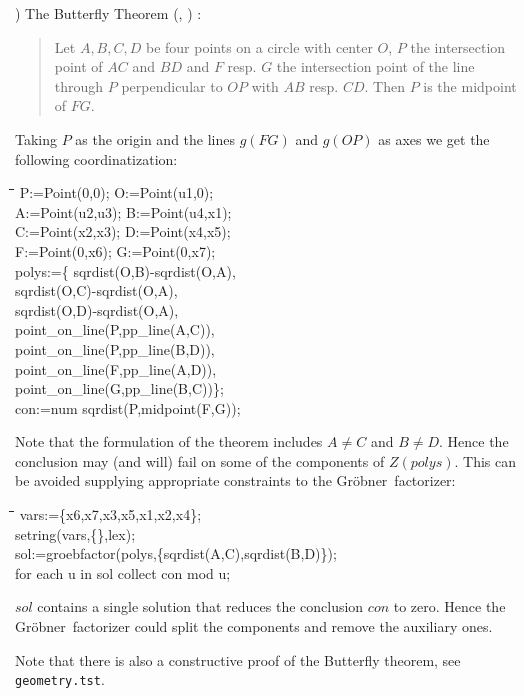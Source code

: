\documentclass{article}
\newenvironment{code}{\tt \begin{tabbing}
\hspace*{1cm}\=\hspace*{1cm}\=\hspace*{1cm}\=
\hspace*{1cm}\=\hspace*{1cm}\=\kill
}{\end{tabbing}}
\newcommand{\gr}{{Gr\"obner}}
\begin{document}
) The Butterfly Theorem (\cite[p. 269]{Chou:84},
\cite[thm. 2.81]{Coxeter:67}) :
\begin{quote}
Let $A,B,C,D$ be four points on a circle with center $O$, $P$ the
intersection point of $AC$ and $BD$ and $F$ resp. $G$ the intersection
point of the line through $P$ perpendicular to $OP$ with $AB$
resp. $CD$. Then $P$ is the midpoint of $FG$.
\end{quote}
Taking $P$ as the origin and the lines $g(FG)$ and $g(OP)$ as axes we
get the following coordinatization:
\begin{code}\>\+
P:=Point(0,0); O:=Point(u1,0);\\
A:=Point(u2,u3); B:=Point(u4,x1);\\
C:=Point(x2,x3); D:=Point(x4,x5); \\
F:=Point(0,x6); G:=Point(0,x7);\-\\[6pt]

polys:=\{\>\> sqrdist(O,B)-sqrdist(O,A),\+\+\\
	sqrdist(O,C)-sqrdist(O,A), \\
	sqrdist(O,D)-sqrdist(O,A),\\
	point\_on\_line(P,pp\_line(A,C)),\\
	point\_on\_line(P,pp\_line(B,D)),\\
	point\_on\_line(F,pp\_line(A,D)),\\
	point\_on\_line(G,pp\_line(B,C))\};\-\-\\[6pt]

con:=num sqrdist(P,midpoint(F,G));
\end{code}
Note that the formulation of the theorem includes $A\neq C$ and $B\neq
D$. Hence the conclusion may (and will) fail on some of the components
of $Z(polys)$. This can be avoided supplying appropriate constraints
to the \gr\ factorizer:
\begin{code}\>\+
vars:=\{x6,x7,x3,x5,x1,x2,x4\};\\
setring(vars,\{\},lex);\\[6pt]

sol:=groebfactor(polys,\{sqrdist(A,C),sqrdist(B,D)\});\\[6pt]

for each u in sol collect con mod u;
\end{code}
$sol$ contains a single solution that reduces the conclusion $con$ to
zero. Hence the \gr\ factorizer could split the components and remove
the auxiliary ones.



Note that there is also a constructive proof of the Butterfly theorem,
see {\tt geometry.tst}.
\medskip
\end{document}
